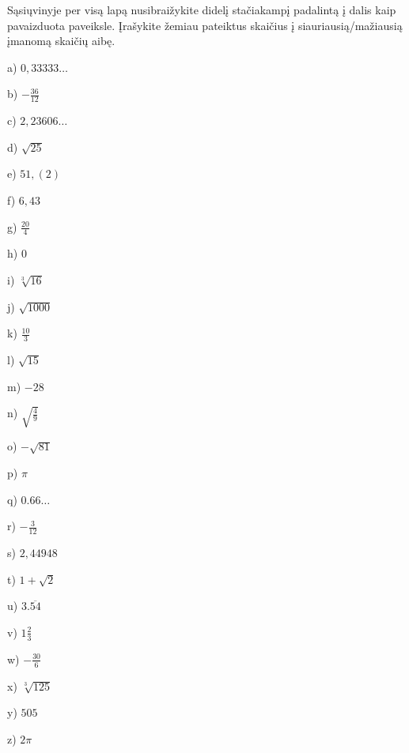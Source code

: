 \begin{uzd}
Sąsiųvinyje per visą lapą nusibraižykite didelį stačiakampį padalintą į dalis kaip pavaizduota paveiksle.
Įrašykite žemiau pateiktus skaičius į siauriausią/mažiausią įmanomą skaičių aibę.
\begin{multicols}{7}
a) $0,33333 \ldots$

b) $-\frac{36}{12}$

c) $2,23606 \ldots$

d) $\sqrt{25}$

e) $51,(2)$

f) $6,43$

g) $\frac{20}{4}$

h) $0$

i) $\sqrt[3]{16}$

j) $\sqrt{1000}$

k) $\frac{10}{3}$

l) $\sqrt{15}$

m) $-28$

n) $\sqrt{\frac{4}{9}}$

o) $-\sqrt{81}$

p) $\pi$

q) $0.66 \ldots$

r) $-\frac{3}{12}$

s) $2,44948$

t) $1+\sqrt{2}$

u) $3.\overline{54}$

v) $1 \frac{2}{3}$

w) $-\frac{30}{6}$

x) $\sqrt[3]{125}$

y) $505$

z) $2 \pi$
\end{multicols}

\begin{center}
\end{center}
\end{uzd}
